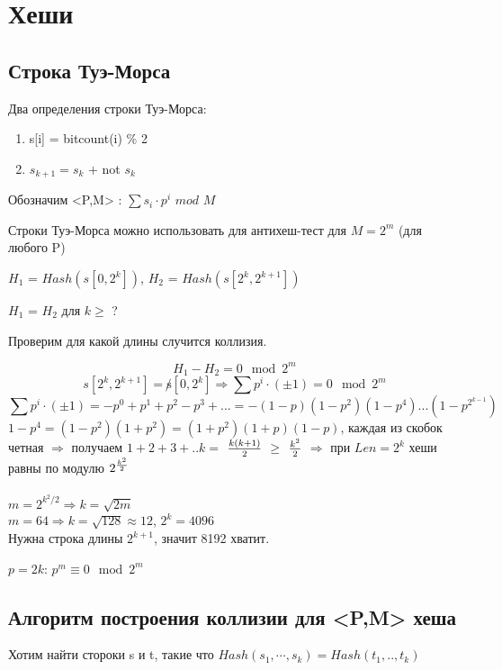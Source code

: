 ﻿
\section{Хеши}
\subsection{Строка Туэ-Морса}

\begin{Def} 
   Два определения строки Туэ-Морса:
   \begin{enumerate}
       \item s[i] = bitcount(i) \% 2
       \item $s_{k+1} = s_k$ + not $s_k$
   \end{enumerate} 
\end{Def}


Обозначим <P,M> : $\sum s_i \cdot p^i $ $mod $ $M$ 

Строки Туэ-Морса можно использовать для антихеш-тест для  $M = 2^{m}$ (для любого P)


$H_1$ = $Hash(s[0,2^k])$, $H_2$ = $Hash(s[2^k,2^{k+1}])$ 

$H_1$ = $H_2$ для $k \ge$ ? 

Проверим для какой длины случится коллизия.

$$H_1 - H_2 = 0 \mod 2^m$$
$$s[2^k,2^{k+1}] = \not s[0,2^k] \Rightarrow \sum p^i \cdot (\pm1) = 0 \mod 2^{m}$$  
$$\sum p^i \cdot (\pm1) = -p^0 + p^1 + p^2 - p^3 + ... = -(1-p)(1-p^2)(1-p^4)...(1 - p^{2^{k-1}})$$
$1-p^4 = (1-p^2)(1+p^2) = (1+p^2)(1+p)(1-p)$, каждая из скобок четная $\Rightarrow $ получаем $1+2+3+..k = $ $k(k+1)\over{2}$ $ \ge$ $k^2\over{2}$ $\Rightarrow $ при $Len = 2^k$ хеши равны по модулю $2^{k^2\over{2}}$\\\\
$m = 2^{k^2/2} \Rightarrow k = \sqrt{2m}$ \\
$m = 64 \Rightarrow k = \sqrt{128} \approx 12$, $2^k = 4096$\\
Нужна строка длины $2^{k+1}$, значит 8192 хватит. \\
\begin{Rem}
    $p = 2k$: $p^m \equiv 0 \mod 2^m$ 
\end{Rem}

\subsection{Алгоритм построения коллизии для <P,M> хеша}
Хотим найти стороки s и t, такие что $Hash(s_1, \cdots ,s_k) = Hash(t_1,..,t_k)$
 
